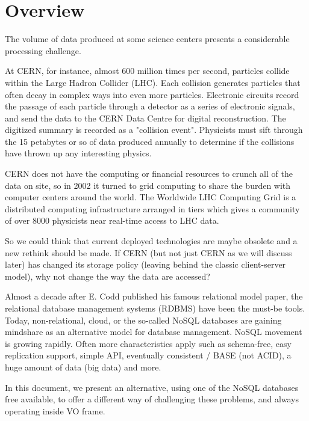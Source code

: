 \chapter{Overview}


The volume of data produced at some science centers presents a considerable processing challenge.

At CERN, for instance, almost 600 million times per second, particles collide within the Large Hadron Collider (LHC). Each collision generates particles that often decay in complex ways into even more particles. Electronic circuits record the passage of each particle through a detector as a series of electronic signals, and send the data to the CERN Data Centre for digital reconstruction. The digitized summary is recorded as a "collision event". Physicists must sift through the 15 petabytes or so of data produced annually to determine if the collisions have thrown up any interesting physics.  \newline

CERN does not have the computing or financial resources to crunch all of the data on site, so in 2002 it turned to grid computing to share the burden with computer centers around the world. The Worldwide LHC Computing Grid is a distributed computing infrastructure arranged in tiers which gives a community of over 8000 physicists near real-time access to LHC data.  \newline

So we could think that current deployed technologies are maybe obsolete and a new rethink should be made. If CERN (but not just CERN as we will discuss later) has changed its storage policy (leaving behind the classic client-server model), why not change the way the data are accessed?  \newline

Almost a decade after E. Codd published his famous relational model paper, the relational database management systems (RDBMS) have been the must-be tools. Today, non-relational, cloud, or the so-called NoSQL databases are gaining mindshare as an alternative model for database management. NoSQL movement is growing rapidly. Often more characteristics apply such as schema-free, easy replication support, simple API, eventually consistent / BASE (not ACID), a huge amount of data (big data) and more. \newline

In this document, we present an alternative, using one of the NoSQL databases free available, to offer a different way of challenging these problems, and always operating inside VO frame.